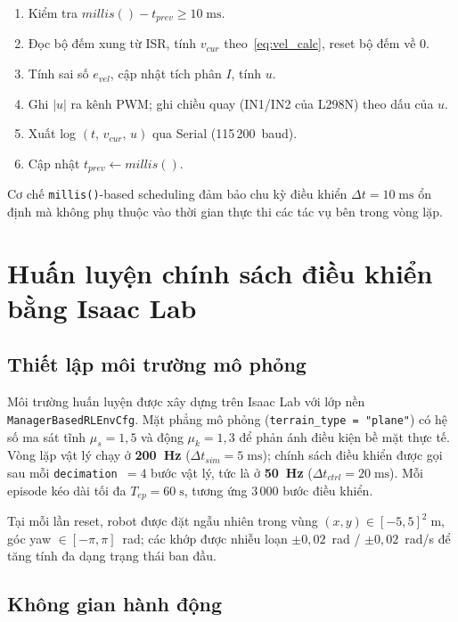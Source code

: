 \begin{enumerate}
    \item Kiểm tra $\mathit{millis}() - t_{prev} \geq 10\;\text{ms}$.
    \item Đọc bộ đếm xung từ ISR, tính $v_{cur}$ theo~\eqref{eq:vel_calc},
    reset bộ đếm về 0.
    \item Tính sai số $e_{vel}$, cập nhật tích phân $I$, tính $u$.
    \item Ghi $|u|$ ra kênh PWM; ghi chiều quay (IN1/IN2 của L298N) theo
    dấu của $u$.
    \item Xuất log $(t,\,v_{cur},\,u)$ qua Serial (115\,200~baud).
    \item Cập nhật $t_{prev} \leftarrow \mathit{millis}()$.
\end{enumerate}

Cơ chế \texttt{millis()}-based scheduling đảm bảo chu kỳ điều khiển
$\Delta t = 10\;\text{ms}$ ổn định mà không phụ thuộc vào thời gian
thực thi các tác vụ bên trong vòng lặp.


\section{Huấn luyện chính sách điều khiển bằng Isaac Lab}
\label{sec:isaaclab_train}

\subsection{Thiết lập môi trường mô phỏng}

Môi trường huấn luyện được xây dựng trên Isaac Lab với lớp nền
\texttt{ManagerBasedRLEnvCfg}. Mặt phẳng mô phỏng (\texttt{terrain\_type = "plane"})
có hệ số ma sát tĩnh $\mu_s = 1{,}5$ và động $\mu_k = 1{,}3$ để phản ánh
điều kiện bề mặt thực tế. Vòng lặp vật lý chạy ở \textbf{200~Hz}
($\Delta t_{sim} = 5\;\text{ms}$); chính sách điều khiển được gọi sau mỗi
\texttt{decimation}~$= 4$ bước vật lý, tức là ở \textbf{50~Hz}
($\Delta t_{ctrl} = 20\;\text{ms}$). Mỗi episode kéo dài tối đa
$T_{ep} = 60\;\text{s}$, tương ứng 3\,000 bước điều khiển.

Tại mỗi lần reset, robot được đặt ngẫu nhiên trong vùng
$(x,y) \in [-5, 5]^2\;\text{m}$, góc yaw $\in [-\pi, \pi]$~rad;
các khớp được nhiễu loạn $\pm 0{,}02$~rad / $\pm 0{,}02$~rad/s để
tăng tính đa dạng trạng thái ban đầu.

\subsection{Không gian hành động}

